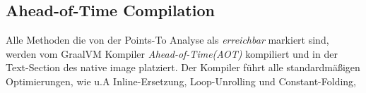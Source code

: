 \subsection{Ahead-of-Time Compilation}
\label{subsec:aotc}

Alle Methoden die von der Points-To Analyse als \textit{erreichbar} markiert sind, werden vom GraalVM Kompiler \textit{Ahead-of-Time(AOT)} kompiliert und in der Text-Section des native image platziert. Der Kompiler führt alle standardmäßigen Optimierungen, wie u.A Inline-Ersetzung, Loop-Unrolling und Constant-Folding, 
